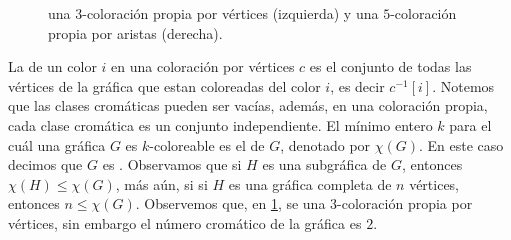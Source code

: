 \begin{figure}[ht!]
    \centering
    \caption{una $3$-coloraci\'on propia por v\'ertices (izquierda) y una 
        $5$-coloraci\'on propia por aristas (derecha).}
        \label{fig:ex-color-prop}
\end{figure}

La  de un color $i$ en una coloraci\'on por v\'ertices
$c$ es el conjunto de todas las v\'ertices de la gr\'afica que estan coloreadas
del color $i$, es decir $c^{-1}[i]$. Notemos que las clases crom\'aticas pueden
ser vac\'ias, adem\'as, en una coloraci\'on propia, cada clase crom\'atica es un
conjunto independiente. El m\'inimo entero $k$ para el cu\'al una gr\'afica $G$
es $k$-coloreable es el  de $G$, denotado por
$\chi(G)$. En este caso decimos que $G$ es
. Observamos que si $H$ es una
subgr\'afica de $G$, entonces $\chi(H) \leq \chi(G)$, m\'as a\'un, si si $H$ es
una gr\'afica completa de $n$ v\'ertices, entonces $n \leq \chi(G)$. Observemos
que, en \cref{fig:ex-color-prop}, se una $3$-coloraci\'on propia por
v\'ertices, sin embargo el n\'umero crom\'atico de la gr\'afica es $2$.
